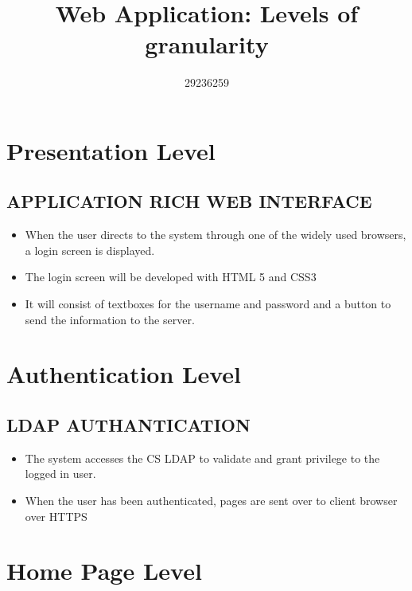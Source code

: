 \documentclass[11pt,a4paper]{article}
\begin{document}
\begin{titlepage}
\title{Web Application: Levels of granularity}
\author{29236259}
\maketitle
\end{titlepage}


\section{Presentation Level}
\subsection{APPLICATION RICH WEB INTERFACE}
\begin{itemize}
\item When the user directs to the system through one of the widely used browsers, a login screen is displayed. 
\item The login screen will be developed with HTML 5 and CSS3
\item It will consist of textboxes for the username and password and a button to send the information to the server.
\end{itemize}
\section{Authentication Level}
\subsection{LDAP AUTHANTICATION}
\begin{itemize}
\item The system accesses the CS LDAP to validate and grant privilege to the logged in user.
\item When the user has been authenticated, pages are sent over to client browser over HTTPS
\end{itemize}
\section{Home Page Level}
\end{document}
